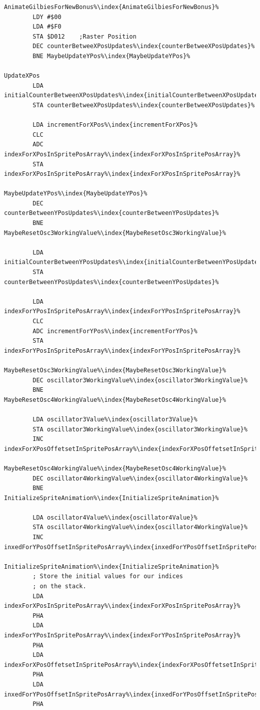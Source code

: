 \begin{minipage}[b]{0.45\linewidth}
\centering
\begin{lstlisting}[basicstyle=\tiny\ttfamily,caption=... and Iridis Alpha.,escapechar=\%]
AnimateGilbiesForNewBonus%\index{AnimateGilbiesForNewBonus}%
        LDY #$00
        LDA #$F0
        STA $D012    ;Raster Position
        DEC counterBetweeXPosUpdates%\index{counterBetweeXPosUpdates}%
        BNE MaybeUpdateYPos%\index{MaybeUpdateYPos}%

UpdateXPos
        LDA initialCounterBetweenXPosUpdates%\index{initialCounterBetweenXPosUpdates}%
        STA counterBetweeXPosUpdates%\index{counterBetweeXPosUpdates}%

        LDA incrementForXPos%\index{incrementForXPos}%
        CLC
        ADC indexForXPosInSpritePosArray%\index{indexForXPosInSpritePosArray}%
        STA indexForXPosInSpritePosArray%\index{indexForXPosInSpritePosArray}%

MaybeUpdateYPos%\index{MaybeUpdateYPos}%   
        DEC counterBetweenYPosUpdates%\index{counterBetweenYPosUpdates}%
        BNE MaybeResetOsc3WorkingValue%\index{MaybeResetOsc3WorkingValue}%

        LDA initialCounterBetweenYPosUpdates%\index{initialCounterBetweenYPosUpdates}%
        STA counterBetweenYPosUpdates%\index{counterBetweenYPosUpdates}%

        LDA indexForYPosInSpritePosArray%\index{indexForYPosInSpritePosArray}%
        CLC
        ADC incrementForYPos%\index{incrementForYPos}%
        STA indexForYPosInSpritePosArray%\index{indexForYPosInSpritePosArray}%

MaybeResetOsc3WorkingValue%\index{MaybeResetOsc3WorkingValue}%   
        DEC oscillator3WorkingValue%\index{oscillator3WorkingValue}%
        BNE MaybeResetOsc4WorkingValue%\index{MaybeResetOsc4WorkingValue}%

        LDA oscillator3Value%\index{oscillator3Value}%
        STA oscillator3WorkingValue%\index{oscillator3WorkingValue}%
        INC indexForXPosOffetsetInSpritePosArray%\index{indexForXPosOffetsetInSpritePosArray}%

MaybeResetOsc4WorkingValue%\index{MaybeResetOsc4WorkingValue}%   
        DEC oscillator4WorkingValue%\index{oscillator4WorkingValue}%
        BNE InitializeSpriteAnimation%\index{InitializeSpriteAnimation}%

        LDA oscillator4Value%\index{oscillator4Value}%
        STA oscillator4WorkingValue%\index{oscillator4WorkingValue}%
        INC inxedForYPosOffsetInSpritePosArray%\index{inxedForYPosOffsetInSpritePosArray}%

InitializeSpriteAnimation%\index{InitializeSpriteAnimation}%   
        ; Store the initial values for our indices
        ; on the stack.
        LDA indexForXPosInSpritePosArray%\index{indexForXPosInSpritePosArray}%
        PHA
        LDA indexForYPosInSpritePosArray%\index{indexForYPosInSpritePosArray}%
        PHA
        LDA indexForXPosOffetsetInSpritePosArray%\index{indexForXPosOffetsetInSpritePosArray}%
        PHA
        LDA inxedForYPosOffsetInSpritePosArray%\index{inxedForYPosOffsetInSpritePosArray}%
        PHA
\end{lstlisting}
\end{minipage}


